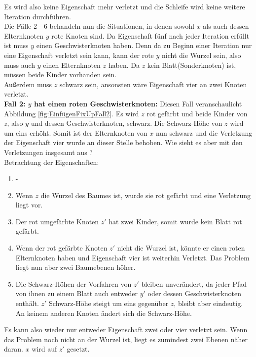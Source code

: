 \documentclass[a4paper,12pt]{article}
\begin{document}
\noindent Es wird also keine Eigenschaft mehr verletzt und die Schleife wird keine weitere Iteration durchführen.\\
Die Fälle 2 - 6 behandeln nun die Situationen, in denen sowohl $x$ als auch dessen Elternknoten $y$ rote Knoten sind. Da Eigenschaft fünf nach jeder Iteration erfüllt ist muss $y$ einen Geschwisterknoten haben. Denn da zu Beginn einer Iteration nur eine Eigenschaft verletzt sein kann, kann der rote $y$ nicht die Wurzel sein, also muss auch $y$ einen Elternknoten $z$ haben. Da $z$ kein Blatt(Sonderknoten) ist, müssen beide Kinder vorhanden sein.\\
Außerdem muss $z$ schwarz sein, ansonsten wäre Eigenschaft vier an zwei Knoten verletzt.\\

\noindent\textbf{Fall 2: $y$ hat einen roten Geschwisterknoten: }
\noindent Diesen Fall veranschaulicht Abbildung \ref{fig:EinfügenFixUpFall2}. Es wird $z$ rot gefärbt und beide Kinder von $z$, also $y$ und dessen Geschwisterknoten, schwarz. Die Schwarz-Höhe von $z$ wird um eins erhöht. Somit ist der Elternknoten von $x$ nun schwarz und die Verletzung der Eigenschaft vier wurde an dieser Stelle behoben. Wie sieht es aber mit den Verletzungen insgesamt aus ? \\

Betrachtung der Eigenschaften:

\begin{enumerate}
	\item -
	\item Wenn $z$ die Wurzel des Baumes ist, wurde sie rot gefärbt und eine Verletzung liegt vor.
	\item Der rot umgefärbte Knoten $z'$ hat zwei Kinder, somit wurde kein Blatt rot gefärbt.
	\item  Wenn der rot gefärbte Knoten $z'$ nicht die Wurzel ist, könnte er einen roten Elternknoten haben und Eigenschaft vier ist weiterhin Verletzt. Das Problem liegt nun aber zwei Baumebenen höher.
	\item  Die Schwarz-Höhen der Vorfahren von $z'$ bleiben unverändert, da jeder Pfad von ihnen zu einem Blatt auch entweder $y'$ oder dessen Geschwisterknoten enthält. $z'$ Schwarz-Höhe steigt um eins gegenüber $z$, bleibt aber eindeutig. An keinem anderen Knoten ändert sich die Schwarz-Höhe. 
	
\end{enumerate} 
Es kann also wieder nur entweder Eigenschaft zwei oder vier verletzt sein. Wenn das Problem noch nicht an der Wurzel ist, liegt es zumindest zwei Ebenen näher daran. $x$ wird auf $z'$ gesetzt. 
\end{document}
